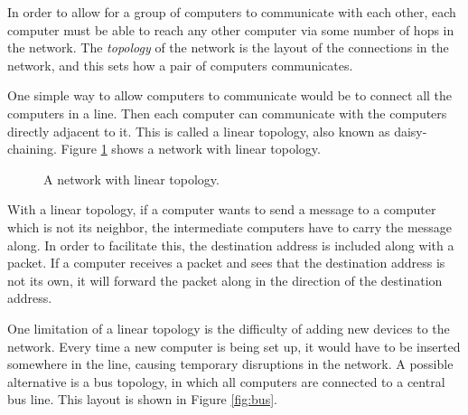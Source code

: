In order to allow for a group of computers to communicate with each other, each computer must be able to reach any other computer via some number of hops in the network. The \emph{topology} of the network is the layout of the connections in the network, and this sets how a pair of computers communicates. 

One simple way to allow computers to communicate would be to connect all the computers in a line. Then each computer can communicate with the computers directly adjacent to it. This is called a linear topology, also known as daisy-chaining. Figure \ref{fig:daisy_chain} shows a network with linear topology.

\begin{figure}
    \centering
    \caption{A network with linear topology.}
    \label{fig:daisy_chain}
\end{figure}

With a linear topology, if a computer wants to send a message to a computer which is not its neighbor, the intermediate computers have to carry the message along. In order to facilitate this, the destination address is included along with a packet. If a computer receives a packet and sees that the destination address is not its own, it will forward the packet along in the direction of the destination address.

One limitation of a linear topology is the difficulty of adding new devices to the network. Every time a new computer is being set up, it would have to be inserted somewhere in the line, causing temporary disruptions in the network. A possible alternative is a bus topology, in which all computers are connected to a central bus line. This layout is shown in Figure \ref{fig:bus}.

